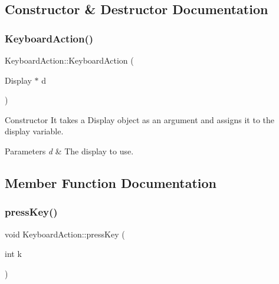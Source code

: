 \subsection{Constructor \& Destructor Documentation}
\mbox{\label{classUbuntuController_1_1KeyboardAction_af59163694e9b55ceaa75d779363e7fc9}} 
\subsubsection{\texorpdfstring{Keyboard\+Action()}{KeyboardAction()}}
{\footnotesize\ttfamily Keyboard\+Action\+::\+Keyboard\+Action (\begin{DoxyParamCaption}\item[{Display $\ast$}]{d }\end{DoxyParamCaption})}

Constructor It takes a Display object as an argument and assigns it to the display variable.


\begin{DoxyParams}{Parameters}
{\em d} & The display to use. \\
\hline
\end{DoxyParams}


\subsection{Member Function Documentation}
\mbox{\label{classUbuntuController_1_1KeyboardAction_ab09e3956685d6fb11cd1cdf86a673b48}} 
\subsubsection{\texorpdfstring{press\+Key()}{pressKey()}}
{\footnotesize\ttfamily void Keyboard\+Action\+::press\+Key (\begin{DoxyParamCaption}\item[{int}]{k }\end{DoxyParamCaption})}

